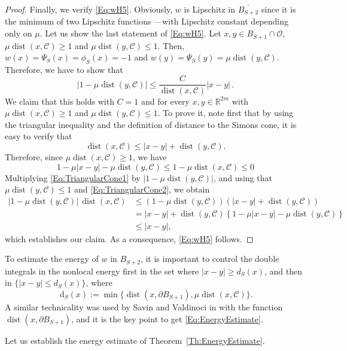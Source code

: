 \documentclass[12pt,reqno]{amsart}
\theoremstyle{definition}
\theoremstyle{remark}
\newcommand{\con}[1]{\mathbb{#1}}
\newcommand{\R}{\con{R}} %
\newcommand{\ccal}{\mathscr{C}}
\newcommand{\ocal}{\mathcal{O}}
\renewcommand{\d}{\,\mathrm{d}} %
\DeclareMathOperator{\dist}{dist}
\numberwithin{equation}{section}
\begin{document}
\begin{proof}
	Finally, we verify \eqref{Eq:wH5}. Obviously, $w$ is Lipschitz in $\overline{B_{S+2}}$ since it is the minimum of two Lipschitz functions ---with Lipschitz constant depending only on $\mu$. Let us show the last statement of \eqref{Eq:wH5}. Let $x,y \in B_{S+1}\cap \ocal$, $\mu \dist(x,\ccal)\geq 1$ and $\mu \dist(y,\ccal)\leq 1$. Then, $w(x)= \Psi_S(x) = \phi_S(x) = -1$ and $w(y)=\Psi_S(y) = \mu \dist(y,\ccal)$. Therefore, we have to show that
	$$
	|1-\mu \dist(y,\ccal)|\leq \dfrac{C}{\dist(x,\ccal)}|x-y|\,.
	$$
	We claim that this holds with $C=1$ and for every $x,y \in \R^{2m}$ with $\mu \dist(x,\ccal)\geq 1$ and $\mu \dist(y,\ccal)\leq 1$. To prove it, note first that by using the triangular inequality and the definition of distance to the Simons cone, it is easy to verify that
	\begin{equation} 
	\label{Eq:TriangularCone1}
	\dist(x,\ccal) \leq |x-y| + \dist(y,\ccal).
	\end{equation}
	Therefore, since $\mu \dist(x,\ccal)\geq 1$, we have
	\begin{equation} 
	\label{Eq:TriangularCone2}
	1-\mu |x-y|- \mu \dist(y,\ccal) \leq 1-\mu\dist(x,\ccal) \leq 0
	\end{equation}
	Multiplying \eqref{Eq:TriangularCone1} by $|1-\mu\dist(y,\ccal)|$, and using that $\mu \dist(y,\ccal)\leq 1$ and \eqref{Eq:TriangularCone2}, we obtain
	\begin{align*}
	|1-\mu\dist(y,\ccal)|\,\dist(x,\ccal) &\leq (1-\mu\dist(y,\ccal)) \left(|x-y| + \dist(y,\ccal)\right) \\
	&= |x-y|+\dist(y,\ccal) \left\{ 1 -\mu |x-y|- \mu \dist(y,\ccal) \right\} \\
	&\leq |x-y|,
	\end{align*}
	which establishes our claim. As a consequence, \eqref{Eq:wH5} follows.	
\end{proof}



To estimate the energy of $w$ in $B_{S+2}$, it is important to control the double integrals in the nonlocal energy  first in the set where $|x-y|\geq d_S(x)$, and then in $\{|x-y|\leq d_S(x)\}$, where 
$$ 
\d_S (x) 
:= \min \{\dist(x, \partial B_{S+1}),\mu \dist(x,\ccal)\}.
$$
A similar technicality was used by Savin and Valdinoci in \cite{SavinValdinoci-EnergyEstimate} with the function $\dist(x, \partial B_{S+1})$, and it is the key point to get \eqref{Eq:EnergyEstimate}. 


Let us establish the energy estimate of Theorem~\ref{Th:EnergyEstimate}. 
\end{document}
